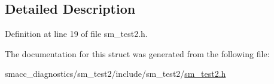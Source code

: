 \subsection{Detailed Description}


Definition at line 19 of file sm\+\_\+test2.\+h.



The documentation for this struct was generated from the following file\+:\begin{DoxyCompactItemize}
\item 
smacc\+\_\+diagnostics/sm\+\_\+test2/include/sm\+\_\+test2/\hyperlink{sm__test2_8h}{sm\+\_\+test2.\+h}\end{DoxyCompactItemize}
